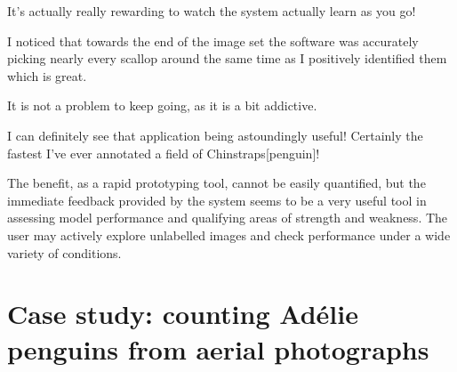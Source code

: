 \begin{displayquote}
It's actually really rewarding to watch the system actually learn as you go!
\end{displayquote}

\begin{displayquote}
I noticed that towards the end of the image set the software was accurately picking nearly every scallop around the same time as I positively identified them which is great.
\end{displayquote}

\begin{displayquote}
 It is not a problem to keep going, as it is a bit addictive.
\end{displayquote}

\begin{displayquote}
I can definitely see that application being astoundingly useful! Certainly the fastest I've ever annotated a field of Chinstraps[penguin]! 
\end{displayquote}

The benefit, as a rapid prototyping tool, cannot be easily quantified, but the immediate feedback provided by the system seems to be a very useful tool in assessing model performance and qualifying areas of strength and weakness. The user may actively explore unlabelled images and check performance under a wide variety of conditions.


\section{Case study: counting Ad\'elie penguins from aerial photographs}
\label{sec:case_penguins}

